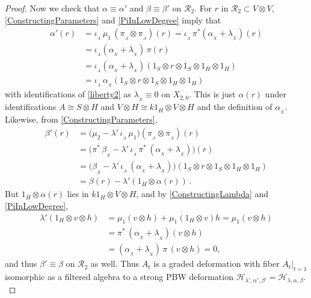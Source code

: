 \documentclass[11pt]{amsart}
\numberwithin{equation}{section}
\newcommand{\X}{_X}
\newcommand{\alphax}{\alpha_{\X}}
\newcommand{\betax}{\beta_{\X}}
\newcommand{\lambdax}{\lambda_{\X}}
\newcommand{\A}{A}%
\newcommand{\sA}{A }
\newcommand{\RR}{\mathscr{R} }
\renewcommand{\_}[1]{\mbox{$_{\left( #1 \right)}$}}
\newcommand{\ot}{\otimes}
\newcommand{\cH}{\mathcal{H}}
\begin{document}
{\begin{proof}
%
Now we check that $\alpha\equiv \alpha'$ and $\beta \equiv \beta'$ on
$\RR_2$.
For $r$ in $\RR_2\subset V\ot V$,
\cref{ConstructingParameters} and 
\cref{PiInLowDegree} imply that
$$\begin{aligned}
  \alpha'(r)
  &=\iota_{_A}\,  \mu_1\, (\pi_{_\A}\ot\pi_{_\A}) (r) 
=\iota_{_A} \, \pi^*(\alphax+\lambdax) (r)\\
&=\iota_{_A} (\alphax+\lambdax)\, \pi(r)\\
&=\iota_{_A} (\alphax+\lambdax)(1_S\ot r \ot 1_S\ot 1_H\ot 1_H)
\\ 
&=\iota_{_A}\, \alphax(1_S\ot r \ot 1_S\ot 1_H\ot 1_H)
\, 
\end{aligned}
$$
with identifications of \cref{liberty2}
as $\lambdax\equiv 0$ on $X_{2,0}$.
This is just $\alpha(r)$ under identifications $A\cong S\ot H$
and $V\ot H \cong k1_H\ot V \ot H$ and the definition of $\alphax$.
%
Likewise, from \cref{ConstructingParameters},
$$\begin{aligned}
  \beta'(r)
  &=\big(\mu_2
  -\lambda'\, \iota_{_A}\,  \mu_1 \big)(\pi_{_\A}\ot\pi_{_\A}) (r)
 \\ &=\big(\pi^*\, \betax
  - \lambda'\, \iota_{_A}\,
  \pi^*\, (\alphax+\lambdax)\big)(r)
 \\ &=\big(\betax- \lambda'\, \iota_{_A}\, (\alphax+\lambdax)\big)
(1_S\ot r \ot 1_S\ot 1_H\ot 1_H)\\
&=\beta(r)- \lambda'(1_H\ot \alpha(r))
\, .
\end{aligned}
$$
But $1_H\ot \alpha(r)$ lies in $k1_H\ot V\ot H$,
and by \cref{ConstructingLambda}
and \cref{PiInLowDegree},
\begin{equation}\label{BetaIsMu2}
\begin{aligned}
\lambda'(1_H\ot v\ot h)
&=
\mu_1(v \ot h) + \mu_1(1_H\ot v) h
=
\mu_1(v \ot h)\\
&=
\pi^*\, (\alphax+\lambdax)(v\ot h)
\\
&=(\alphax+\lambdax)\, \pi\, (v\ot h)
=0,
\end{aligned}
\end{equation}
and thus $\beta'\equiv \beta$ on $\RR_2$ as well.
%
Thus $\A_t$ is a graded deformation with fiber $A_t\big|_{t=1}$
isomorphic as a filtered algebra to a strong PBW deformation
$\cH_{\lambda',\alpha', \beta'}=\cH_{\lambda,\alpha,\beta}$.
\\
\end{proof}

\vspace{1ex}

}
\end{document}
